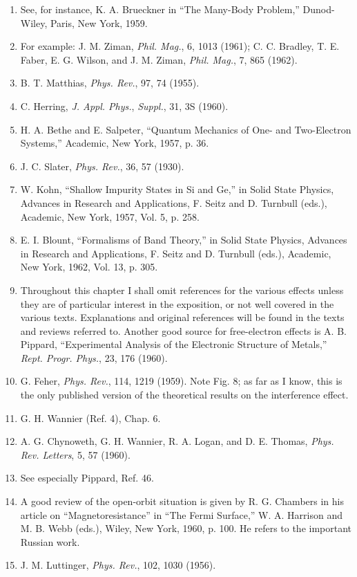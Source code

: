 \begin{enumerate}[label=(\arabic*),leftmargin=2.8em,itemsep=1pt,parsep=0pt]
\item See, for instance, K. A. Brueckner in ``The Many-Body Problem,'' Dunod-Wiley, Paris, New York, 1959.
\item For example: J. M. Ziman, \emph{Phil. Mag.}, 6, 1013 (1961); C. C. Bradley, T. E. Faber, E. G. Wilson, and J. M. Ziman, \emph{Phil. Mag.}, 7, 865 (1962).
\item B. T. Matthias, \emph{Phys. Rev.}, 97, 74 (1955).
\item C. Herring, \emph{J. Appl. Phys.}, \emph{Suppl.}, 31, 3S (1960).
\item H. A. Bethe and E. Salpeter, ``Quantum Mechanics of One- and Two-Electron Systems,'' Academic, New York, 1957, p. 36.
\item J. C. Slater, \emph{Phys. Rev.}, 36, 57 (1930).
\item W. Kohn, ``Shallow Impurity States in Si and Ge,'' in Solid State Physics, Advances in Research and Applications, F. Seitz and D. Turnbull (eds.), Academic, New York, 1957, Vol. 5, p. 258.
\item E. I. Blount, ``Formalisms of Band Theory,'' in Solid State Physics, Advances in Research and Applications, F. Seitz and D. Turnbull (eds.), Academic, New York, 1962, Vol. 13, p. 305.
\item Throughout this chapter I shall omit references for the various effects unless they are of particular interest in the exposition, or not well covered in the various texts. Explanations and original references will be found in the texts and reviews referred to. Another good source for free-electron effects is A. B. Pippard, ``Experimental Analysis of the Electronic Structure of Metals,'' \emph{Rept. Progr. Phys.}, 23, 176 (1960).
\item G. Feher, \emph{Phys. Rev.}, 114, 1219 (1959). Note Fig. 8; as far as I know, this is the only published version of the theoretical results on the interference effect.
\item G. H. Wannier (Ref. 4), Chap. 6.
\item A. G. Chynoweth, G. H. Wannier, R. A. Logan, and D. E. Thomas, \emph{Phys. Rev. Letters}, 5, 57 (1960).
\item See especially Pippard, Ref. 46.
\item A good review of the open-orbit situation is given by R. G. Chambers in his article on ``Magnetoresistance'' in ``The Fermi Surface,'' W. A. Harrison and M. B. Webb (eds.), Wiley, New York, 1960, p. 100. He refers to the important Russian work.
\item J. M. Luttinger, \emph{Phys. Rev.}, 102, 1030 (1956).

\end{enumerate}
